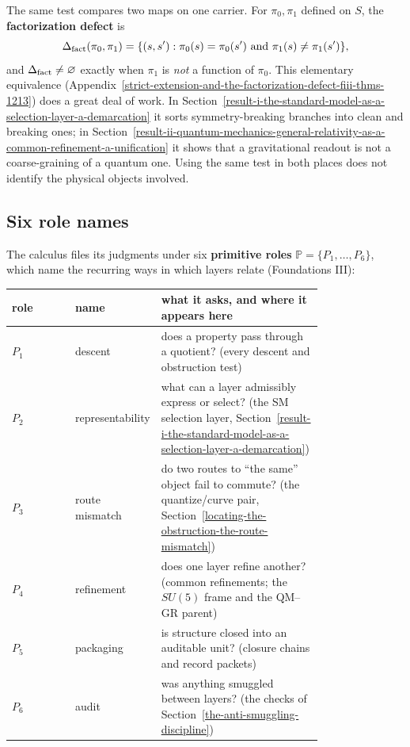 The same test compares two maps on one carrier. For \(\pi_0,\pi_1\) defined on \(S\), the \textbf{factorization
defect} is
\[
\Delta_{\mathrm{fact}}(\pi_0,\pi_1)=\{(s,s') : \pi_0(s)=\pi_0(s')\ \text{and}\ \pi_1(s)\neq\pi_1(s')\},
\]
and \(\Delta_{\mathrm{fact}}\neq\varnothing\) exactly when \(\pi_1\) is \emph{not} a function of \(\pi_0\). This elementary
equivalence (Appendix~\ref{strict-extension-and-the-factorization-defect-fiii-thms-1213}) does a great deal of work.
In Section~\ref{result-i-the-standard-model-as-a-selection-layer-a-demarcation} it sorts symmetry-breaking branches into
clean and breaking ones; in Section~\ref{result-ii-quantum-mechanics-general-relativity-as-a-common-refinement-a-unification}
it shows that a gravitational readout is not a coarse-graining of a quantum one. Using the same test in both places does
not identify the physical objects involved.



\subsection{Six role names}\label{the-six-primitive-roles}

The calculus files its judgments under six \textbf{primitive roles} \(\mathbb P=\{P_1,\dots,P_6\}\), which name the
recurring ways in which layers relate (Foundations III):

\begin{center}
\small
\begin{tabular}{@{}lp{0.26\linewidth}p{0.52\linewidth}@{}}
\toprule
role & name & what it asks, and where it appears here\\
\midrule
\(P_1\) & descent & does a property pass through a quotient? (every descent and obstruction test)\\
\(P_2\) & representability & what can a layer admissibly express or select? (the SM selection layer,
Section~\ref{result-i-the-standard-model-as-a-selection-layer-a-demarcation})\\
\(P_3\) & route mismatch & do two routes to ``the same'' object fail to commute? (the quantize/curve pair,
Section~\ref{locating-the-obstruction-the-route-mismatch})\\
\(P_4\) & refinement & does one layer refine another? (common refinements; the \(SU(5)\) frame and the QM--GR parent)\\
\(P_5\) & packaging & is structure closed into an auditable unit? (closure chains and record packets)\\
\(P_6\) & audit & was anything smuggled between layers? (the checks of Section~\ref{the-anti-smuggling-discipline})\\
\bottomrule
\end{tabular}
\end{center}

